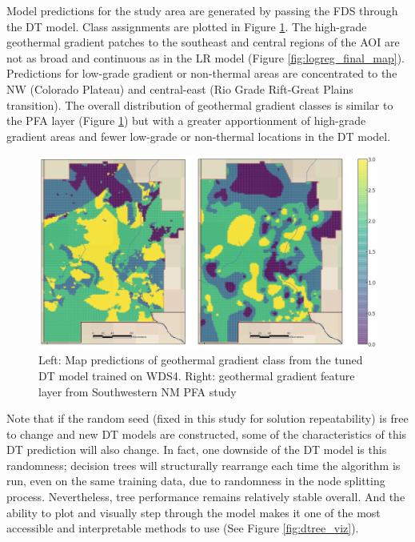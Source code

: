 Model predictions for the study area are generated by passing the FDS through the DT model. Class assignments are plotted in Figure \ref{fig:dtree_final_map}. The high-grade geothermal gradient patches to the southeast and central regions of the AOI are not as broad and continuous as in the LR model (Figure \ref{fig:logreg_final_map}). Predictions for low-grade gradient or non-thermal areas are concentrated to the NW (Colorado Plateau) and central-east (Rio Grade Rift-Great Plains transition). The overall distribution of geothermal gradient classes is similar to the \citet{bielicki_hydrogeolgic_2015} PFA layer (Figure \ref{fig:dtree_final_map}) but with a greater apportionment of high-grade gradient areas and fewer low-grade or non-thermal locations in the DT model.

\begin{figure}%
\centering
\includegraphics[width=\textwidth]{templates/images/Figure-DT-FinalMap_Joint.png}
\caption[Decision tree prediction map]{Left: Map predictions of geothermal gradient class from the tuned DT model trained on WDS4. Right: geothermal gradient feature layer from Southwestern NM PFA study \protect\citep{bielicki_hydrogeolgic_2015}}
\label{fig:dtree_final_map}
\end{figure}

Note that if the random seed (fixed in this study for solution repeatability) is free to change and new DT models are constructed, some of the characteristics of this DT prediction will also change. In fact, one downside of the DT model is this randomness; decision trees will structurally rearrange each time the algorithm is run, even on the same training data, due to randomness in the node splitting process. Nevertheless, tree performance remains relatively stable overall. And the ability to plot and visually step through the model makes it one of the most accessible and interpretable methods to use (See Figure \ref{fig:dtree_viz}).

